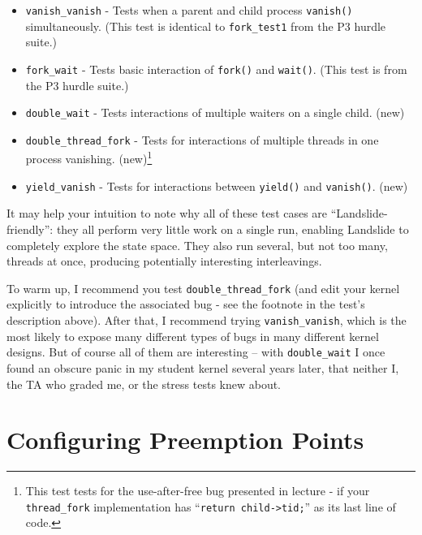 \documentclass{article}
\begin{document}
\begin{itemize}
	\item \texttt{vanish\_vanish} - Tests when a parent and child process \texttt{vanish()} simultaneously. (This test is identical to \texttt{fork\_test1} from the P3 hurdle suite.)
	\item \texttt{fork\_wait} - Tests basic interaction of \texttt{fork()} and \texttt{wait()}. (This test is from the P3 hurdle suite.)
	\item \texttt{double\_wait} - Tests interactions of multiple waiters on a single child. (new)
	\item \texttt{double\_thread\_fork} - Tests for interactions of multiple threads in one process vanishing. (new)\footnote{This test tests for the use-after-free bug presented in lecture - if your \texttt{thread\_fork} implementation has ``\texttt{return child->tid;}'' as its last line of code.}
	\item \texttt{yield\_vanish} - Tests for interactions between \texttt{yield()} and \texttt{vanish()}. (new)
\end{itemize}

It may help your intuition to note why all of these test cases are ``Landslide-friendly'': they all perform very little work on a single run, enabling Landslide to completely explore the state space. They also run several, but not too many, threads at once, producing potentially interesting interleavings.

To warm up, I recommend you test \texttt{double\_thread\_fork} (and edit your kernel explicitly to introduce the associated bug - see the footnote in the test's description above).
After that, I recommend trying \texttt{vanish\_vanish}, which is the most likely to expose many different types of bugs in many different kernel designs.
But of course all of them are interesting -- with \texttt{double\_wait} I once found an obscure panic in my student kernel several years later, that neither I, the TA who graded me, or the stress tests knew about.

\section{Configuring Preemption Points}
\label{sec:choice}
\end{document}
